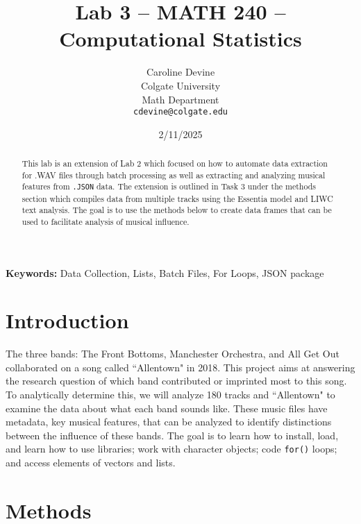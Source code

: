 \documentclass{article}\usepackage[]{graphicx}\usepackage[]{xcolor}
\begin{document}
\vspace{-1in}
\title{Lab 3 -- MATH 240 -- Computational Statistics}

\author{
  Caroline Devine \\
  Colgate University  \\
  Math Department  \\
  {\tt cdevine@colgate.edu}
}

\date{2/11/2025}

\maketitle

\begin{multicols}{2}
\begin{abstract}
This lab is an extension of Lab 2 which focused on how to automate data extraction for .WAV files through batch processing as well as extracting and analyzing musical features from \texttt{.JSON} data. The extension is outlined in Task 3 under the methods section which compiles data from multiple tracks using the Essentia model and LIWC text analysis. The goal is to use the methods below to create data frames that can be used to facilitate analysis of musical influence.
\end{abstract}

\noindent \textbf{Keywords:} Data Collection, Lists, Batch Files, For Loops, JSON package

\section{Introduction}
The three bands: The Front Bottoms, Manchester Orchestra, and All Get Out collaborated on a song called ``Allentown"\citep{Ross} in 2018. This project aims at answering the research question of which band contributed or imprinted most to this song. To analytically determine this, we will analyze 180 tracks and ``Allentown" to examine the data about what each band sounds like. These music files have metadata, key musical features, that can be analyzed to identify distinctions between the influence of these bands. The goal is to learn how to install, load, and learn how to use libraries; work with character objects; code \texttt{for()} loops; and access elements of vectors and lists.

\section{Methods}


\end{multicols}
\end{document}
